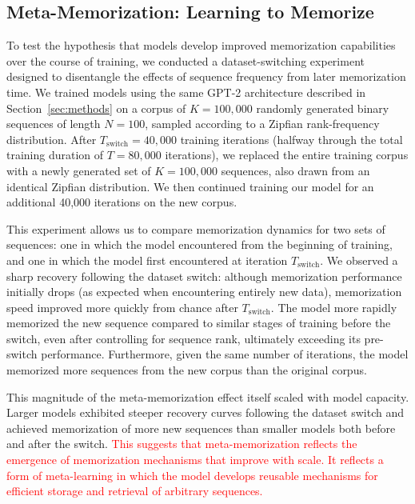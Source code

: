 \documentclass{article}
\theoremstyle{plain}
\theoremstyle{definition}
\theoremstyle{remark}
\begin{document}
\subsection{Meta-Memorization: Learning to Memorize}

To test the hypothesis that models develop improved memorization capabilities over the course of training,
 we conducted a dataset-switching experiment designed to disentangle the effects of sequence frequency 
 from later memorization time. 
We trained models using the same GPT-2 architecture described in Section~\ref{sec:methods}
 on a corpus of $K=100{,}000$ randomly generated binary sequences of length $N=100$, 
 sampled according to a Zipfian rank-frequency distribution. 
 After $T_{\text{switch}}=40{,}000$ training iterations 
 (halfway through the total training duration of $T=80{,}000$ iterations), 
 we replaced the entire training corpus with a newly generated set of $K=100{,}000$ sequences, 
  also drawn from an identical Zipfian distribution. 
  We then continued training our model for an additional 40,000 iterations on the new corpus. 

This experiment allows us to compare memorization dynamics for two sets of sequences: one 
in which the model encountered from the beginning of training, and one in which
 the model first encountered at iteration $T_{\text{switch}}$. 
 We observed a sharp recovery following the dataset switch: 
 although memorization performance initially drops (as expected when encountering entirely new data), 
 memorization speed improved more quickly from chance after $T_{\text{switch}}$. 
 The model more rapidly memorized the new sequence 
 compared to similar stages of training before the switch, even after controlling for sequence rank,
  ultimately exceeding its pre-switch performance. Furthermore, 
  given the same number of iterations, the model memorized more sequences 
  from the new corpus than the original corpus. 
  
  This magnitude of the meta-memorization effect itself scaled with model capacity. 
   Larger models exhibited steeper recovery curves following the dataset switch  
   and achieved memorization of more new sequences than smaller models both before and 
   after the switch.
    \textcolor{red}{This suggests that meta-memorization reflects the emergence of 
    memorization mechanisms that improve with scale. 
    It reflects a form of meta-learning in which the model develops 
    reusable mechanisms for efficient storage and retrieval of arbitrary sequences. }
\end{document}
